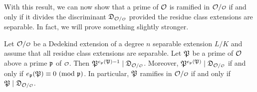     With this result, we can now show that a prime of \(\mathcal{O}\) is ramified in \(\mc{O}/\smc{O}\) if and only if it divides the discriminant \(\mf{D}_{\mc{O}/\smc{O}}\) provided the residue class extensions are separable. In fact, we will prove something slightly stronger.

    \begin{theorem}\label{thm:ramifies_if_and_only_if_divides_the_different}
      Let \(\mc{O}/\smc{O}\) be a Dedekind extension of a degree \(n\) separable extension \(L/K\) and assume that all residue class extensions are separable. Let \(\mathfrak{P}\) be a prime of \(\mathcal{O}\) above a prime \(\mathfrak{p}\) of \(\smc{O}\). Then \(\mf{P}^{e_{\mf{p}}(\mf{P})-1} \mid \mf{D}_{\mc{O}/\smc{O}}\). Moreover, \(\mf{P}^{e_{\mf{p}}(\mf{P})} \mid \mf{D}_{\mc{O}/\smc{O}}\) if and only if \(e_{\mathfrak{p}}(\mathfrak{P}) \equiv 0 \ (\mathrm{mod}\text{ }\mathfrak{p})\). In particular, \(\mathfrak{P}\) ramifies in \(\mc{O}/\smc{O}\) if and only if \(\mf{P} \mid \mf{D}_{\mc{O}/\smc{O}}\).
    \end{theorem}
